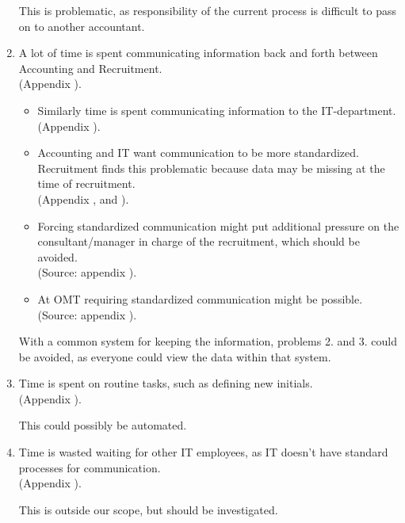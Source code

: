 \begin{enumerate}
\noindent This is problematic, as responsibility of the current process is difficult to pass on to another accountant.

\item A lot of time is spent communicating information back and forth between Accounting and Recruitment. \\
(Appendix ).
\begin{itemize}
\item Similarly time is spent communicating information to the IT-department.\\
(Appendix ).
\item Accounting and IT want communication to be more standardized. Recruitment finds this problematic because data may be missing at the time of recruitment.\\
(Appendix ,  and ).
\item Forcing standardized communication might put additional pressure on the consultant/manager in charge of the recruitment, which should be avoided.\\
(Source: appendix ).
\item At OMT requiring standardized communication might be possible.\\
(Source: appendix ).
\end{itemize}

\noindent With a common system for keeping the information, problems 2. and 3. could be avoided, as everyone could view the data within that system.

\item Time is spent on routine tasks, such as defining new initials.\\
(Appendix ).

\noindent This could possibly be automated.

\item Time is wasted waiting for other IT employees, as IT doesn't have standard processes for communication.\\
(Appendix ).

\noindent This is outside our scope, but should be investigated.
\end{enumerate}

